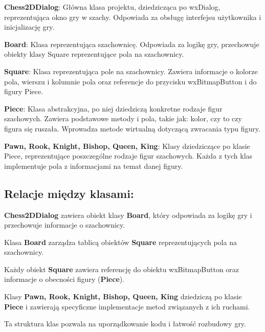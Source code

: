 \documentclass[]{report}
\begin{document}
\textbf{Chess2DDialog}: Główna klasa projektu, dziedzicząca po wxDialog, reprezentująca okno gry w szachy. Odpowiada za obsługę interfejsu użytkownika i inicjalizację gry.\vspace{\baselineskip}

\textbf{Board}: Klasa reprezentująca szachownicę. Odpowiada za logikę gry, przechowuje obiekty klasy Square reprezentujące pola na szachownicy.\vspace{\baselineskip}

\textbf{Square}: Klasa reprezentująca pole na szachownicy. Zawiera informacje o kolorze pola, wierszu i kolumnie pola oraz referencje do przycisku wxBitmapButton i do figury Piece.\vspace{\baselineskip}

\textbf{Piece}: Klasa abstrakcyjna, po niej dziedziczą konkretne rodzaje figur szachowych. Zawiera podstawowe metody i pola, takie jak: kolor, czy to czy figura się ruszała. Wprowadza metode wirtualną dotyczącą zwracania typu figury.\vspace{\baselineskip}

\textbf{Pawn, Rook, Knight, Bishop, Queen, King}: Klasy dziedziczące po klasie Piece, reprezentujące poszczególne rodzaje figur szachowych. Każda z tych klas implementuje pola z informacjami na temat danej figury.

\subsection*{Relacje między klasami:}

\textbf{Chess2DDialog} zawiera obiekt klasy \textbf{Board}, który odpowiada za logikę gry i przechowuje informacje o szachownicy.\vspace{\baselineskip}

Klasa \textbf{Board} zarządza tablicą obiektów \textbf{Square} reprezentujących pola na szachownicy.\vspace{\baselineskip}

Każdy obiekt \textbf{Square} zawiera referencję do obiektu wxBitmapButton oraz informacje o obecności figury (\textbf{Piece}).\vspace{\baselineskip}

Klasy \textbf{Pawn, Rook, Knight, Bishop, Queen, King} dziedziczą po klasie \textbf{Piece} i zawierają specyficzne implementacje metod związanych z ich ruchami.
\begin{flushleft}
Ta struktura klas pozwala na uporządkowanie kodu i łatwość rozbudowy gry.
\end{flushleft}
\end{document}

